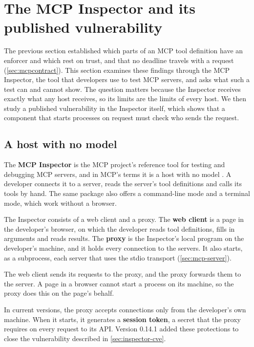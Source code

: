 \section{The MCP Inspector and its published vulnerability}
\label{sec:inspector}

The previous section established which parts of an MCP tool definition have an enforcer and which
rest on trust, and that no deadline travels with a request (\cref{sec:mcpcontract}). This section
examines these findings through the MCP Inspector, the tool that developers use to test MCP
servers, and asks what such a test can and cannot show. The question matters because the Inspector
receives exactly what any host receives, so its limits are the limits of every host. We then study
a published vulnerability in the Inspector itself, which shows that a component that starts
processes on request must check who sends the request.

\subsection{A host with no model}
\label{sec:inspector-host}

The \textbf{MCP Inspector} is the MCP project's reference tool for testing and debugging MCP
servers, and in MCP's terms it is a host with no model \citep{mcp-inspector}. A developer connects
it to a server, reads the server's tool definitions and calls its tools by hand. The same package
also offers a command-line mode and a terminal mode, which work without a browser.

The Inspector consists of a web client and a proxy. The \textbf{web client} is a page in the
developer's browser, on which the developer reads tool definitions, fills in arguments and reads
results. The \textbf{proxy} is the Inspector's local program on the developer's machine, and it
holds every connection to the servers. It also starts, as a subprocess, each server that uses the
stdio transport (\cref{sec:mcp-server}).

The web client sends its requests to the proxy, and the proxy forwards them to the server. A page
in a browser cannot start a process on its machine, so the proxy does this on the page's behalf.

In current versions, the proxy accepts connections only from the developer's own machine. When it
starts, it generates a \textbf{session token}, a secret that the proxy requires on every request to
its API. Version 0.14.1 added these protections to close the vulnerability described in
\cref{sec:inspector-cve}.

